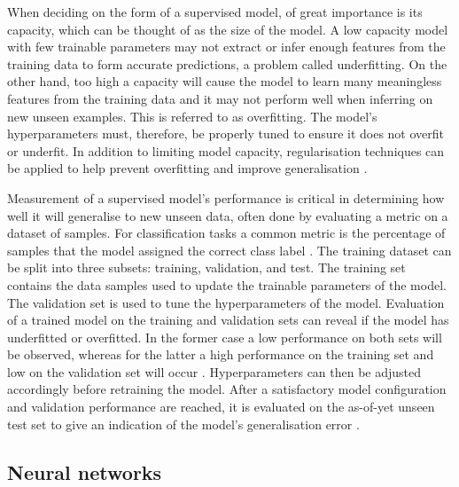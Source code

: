 \documentclass[12pt]{article}
\begin{document}
When deciding on the form of a supervised model, of great importance is its capacity, which can be thought of as the size of the model. A low capacity model with few trainable parameters may not extract or infer enough features from the training data to form accurate predictions, a problem called underfitting. On the other hand, too high a capacity will cause the model to learn many meaningless features from the training data and it may not perform well when inferring on new unseen examples. This is referred to as overfitting. The model's hyperparameters must, therefore, be properly tuned to ensure it does not overfit or underfit. In addition to limiting model capacity, regularisation techniques can be applied to help prevent overfitting and improve generalisation \cite{Murphy12, Goodfellow16}.

Measurement of a supervised model's performance is critical in determining how well it will generalise to new unseen data, often done by evaluating a metric on a dataset of samples. For classification tasks a common metric is the percentage of samples that the model assigned the correct class label \cite{Murphy12}. The training dataset can be split into three subsets: training, validation, and test. The training set contains the data samples used to update the trainable parameters of the model. The validation set is used to tune the hyperparameters of the model. Evaluation of a trained model on the training and validation sets can reveal if the model has underfitted or overfitted. In the former case a low performance on both sets will be observed, whereas for the latter a high performance on the training set and low on the validation set will occur \cite{Murphy12, Goodfellow16}. Hyperparameters can then be adjusted accordingly before retraining the model. After a satisfactory model configuration and validation performance are reached, it is evaluated on the as-of-yet unseen test set to give an indication of the model's generalisation error \cite{Murphy12, Goodfellow16}.

\subsection{Neural networks}
\end{document}
